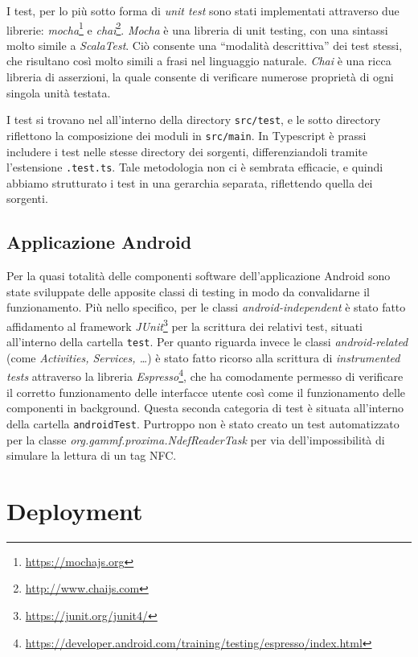 \documentclass[a4paper,12pt]{report}
\begin{document}
I test, per lo più sotto forma di \emph{unit test} sono stati implementati attraverso due librerie: \emph{mocha}\footnote{\url{https://mochajs.org}} e \emph{chai}\footnote{\url{http://www.chaijs.com}}. \emph{Mocha} è una libreria di unit testing, con una sintassi molto simile a \emph{ScalaTest}. Ciò consente una ``modalità descrittiva'' dei test stessi, che risultano così molto simili a frasi nel linguaggio naturale. \emph{Chai} è una ricca libreria di asserzioni, la quale consente di verificare numerose proprietà di ogni singola unità testata. 

I test si trovano nel all'interno della directory \texttt{src/test}, e le sotto directory riflettono la composizione dei moduli in \texttt{src/main}. In Typescript è prassi includere i test nelle stesse directory dei sorgenti, differenziandoli tramite l'estensione \texttt{.test.ts}. Tale metodologia non ci è sembrata efficacie, e quindi abbiamo strutturato i test in una gerarchia separata, riflettendo quella dei sorgenti.
\section{Applicazione Android}

Per la quasi totalità delle componenti software dell'applicazione Android sono state sviluppate delle apposite classi di testing in modo da convalidarne il funzionamento. Più nello specifico, per le classi \emph{android-independent} è stato fatto affidamento al framework \emph{JUnit}\footnote{\url{https://junit.org/junit4/}} per la scrittura dei relativi test, situati all'interno della cartella \texttt{test}. Per quanto riguarda invece le classi \emph{android-related} (come \emph{Activities, Services, \dots}) è stato fatto ricorso alla scrittura di \emph{instrumented tests} attraverso la libreria \emph{Espresso}\footnote{\url{https://developer.android.com/training/testing/espresso/index.html}}, che ha comodamente permesso di verificare il corretto funzionamento delle interfacce utente così come il funzionamento delle componenti in background. Questa seconda categoria di test è situata all'interno della cartella \texttt{androidTest}. Purtroppo non è stato creato un test automatizzato per la classe \emph{org.gammf.proxima.NdefReaderTask} per via dell'impossibilità di simulare la lettura di un tag NFC.


\chapter{Deployment} \label{deployment}
\end{document}
